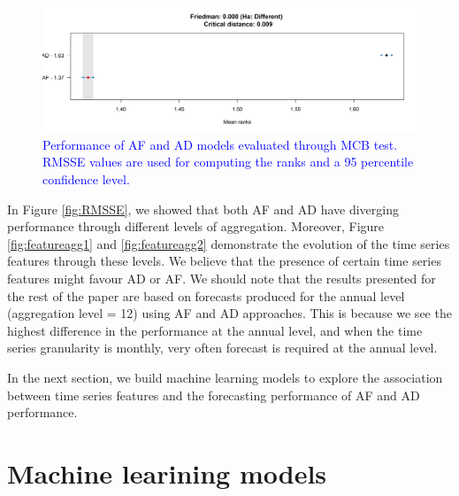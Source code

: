 \documentclass[preprint, 3p,
authoryear]{elsarticle} %
\begin{document}
\begin{figure}[H]

{\centering \includegraphics[width=1\linewidth]{img/300dpi/Fig_MCB} 

}

\caption{ \textcolor{blue}{Performance of AF and AD models evaluated through MCB test. RMSSE values are used for computing the ranks and a 95 percentile confidence level.}}\label{fig:MCB}
\end{figure}

In Figure \ref{fig:RMSSE}, we showed that both AF and AD have diverging
performance through different levels of aggregation. Moreover, Figure
\ref{fig:featureagg1} and \ref{fig:featureagg2} demonstrate the
evolution of the time series features through these levels. We believe
that the presence of certain time series features might favour AD or AF.
We should note that the results presented for the rest of the paper are
based on forecasts produced for the annual level (aggregation level =
12) using AF and AD approaches. This is because we see the highest
difference in the performance at the annual level, and when the time
series granularity is monthly, very often forecast is required at the
annual level.

In the next section, we build machine learning models to explore the
association between time series features and the forecasting performance
of AF and AD performance.

\hypertarget{ml}{%
\section{Machine learining models}\label{ml}}
\end{document}
